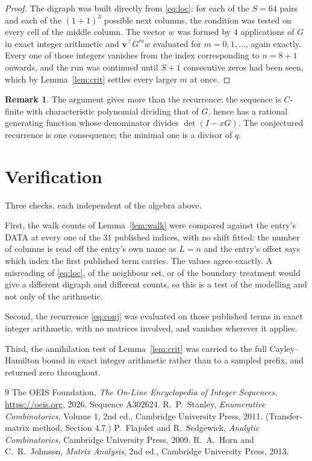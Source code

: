 \documentclass[11pt,a4paper]{article}
\theoremstyle{plain}
\theoremstyle{definition}
\newtheorem{remark}[theorem]{Remark}
\begin{document}
\begin{proof}
The digraph was built directly from \eqref{eq:loc}: for each of the $S=64$ pairs and each
of the $(1+1)^{3}$ possible next columns, the condition was tested on every cell of
the middle column. The vector $w$ was formed by $4$ applications of $G$ in exact integer
arithmetic and $\mathbf{v}^{\!\top}G^{m}w$ evaluated for $m=0,1,\dots$, again exactly.
Every one of those integers vanishes from the index corresponding to $n=8+1$ onwards,
and the run was continued until $S+1$ consecutive zeros had been seen, which by
Lemma~\ref{lem:crit} settles every larger $m$ at once.
\end{proof}

\begin{remark}
The argument gives more than the recurrence: the sequence is $C$-finite with characteristic
polynomial dividing that of $G$, hence has a rational generating function whose denominator
divides $\det(I-xG)$. The conjectured recurrence is one consequence; the minimal one is a
divisor of $q$.
\end{remark}

\section{Verification}

Three checks, each independent of the algebra above.

First, the walk counts of Lemma~\ref{lem:walk} were compared against the entry's DATA at
every one of the $31$ published indices, with no shift fitted: the number of columns is
read off the entry's own name as $L=n$ and the entry's offset says which index the first
published term carries. The values agree exactly. A misreading of \eqref{eq:loc}, of the
neighbour set, or of the boundary treatment would give a different digraph and different
counts, so this is a test of the modelling and not only of the arithmetic.

Second, the recurrence \eqref{eq:conj} was evaluated on those published terms in exact
integer arithmetic, with no matrices involved, and vanishes wherever it applies.

Third, the annihilation test of Lemma~\ref{lem:crit} was carried to the full
Cayley--Hamilton bound in exact integer arithmetic rather than to a sampled prefix, and
returned zero throughout.

\begin{thebibliography}{9}
 The OEIS Foundation, \emph{The On-Line Encyclopedia of Integer
Sequences}, \url{https://oeis.org}, 2026. Sequence A302624.
 R.~P.~Stanley, \emph{Enumerative Combinatorics}, Volume 1, 2nd ed.,
Cambridge University Press, 2011. (Transfer-matrix method, Section 4.7.)
 P.~Flajolet and R.~Sedgewick, \emph{Analytic Combinatorics}, Cambridge
University Press, 2009.
 R.~A.~Horn and C.~R.~Johnson, \emph{Matrix Analysis}, 2nd ed., Cambridge
University Press, 2013.
\end{thebibliography}
\end{document}

